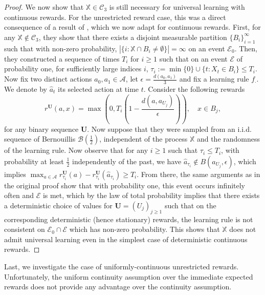 \documentclass[aos]{imsart}
\theoremstyle{plain}
\theoremstyle{remark}
\newcommand{\Acal}{\mathcal{A}}
\newcommand{\Bcal}{\mathcal{B}}
\newcommand{\Ccal}{\mathcal{C}}
\newcommand{\Ecal}{\mathcal{E}}
\newcommand{\Xbb}{\mathbb{X}}
\newcommand{\1}{\mathbbm{1}}%
\newcommand{\mb}[1]{\ensuremath{\boldsymbol{#1}}}
\begin{document}
\begin{proof}
We now show that $\Xbb\in \Ccal_3$ is still necessary for universal learning with continuous rewards. For the unrestricted reward case, this was a direct consequence of a result of \citep*{blanchard:22b}, which we now adapt for continuous rewards. First, for any $\Xbb\notin\Ccal_3$, they show that there exists a disjoint measurable partition $\{B_i\}_{i=1}^\infty$ such that with non-zero probability, $|\{i:\Xbb\cap B_i\neq \emptyset\}|=\infty$ on an event $\Ecal_0$. Then, they constructed a sequence of times $T_i$ for $i\geq 1$ such that on an event $\Ecal$ of probability one, for sufficiently large indices $i$, $\tau_i:=\min\{0\}\cup\{t: X_t\in B_i\} \leq T_i$. Now fix two distinct actions $a_0,a_1\in\Acal$, let $\epsilon = \frac{d(a_0,a_1)}{3}$ and fix a learning rule $f_\cdot$. We denote by $\hat a_t$ its selected action at time $t$. Consider the following rewards
\begin{equation}
    r^{\mb U}(a, x) = \max\left(0,T_i\left(1-\frac{d(a,a_{U_j})}{\epsilon}\right) \right),\quad x\in B_j,
\end{equation}
for any binary sequence $\mb U$. Now suppose that they were sampled from an i.i.d. sequence of Bernouillis $\Bcal(\frac{1}{2})$, independent of the process $\Xbb$ and the randomness of the learning rule. Now observe that for any $i\geq 1$ such that $\tau_i\leq T_i$, with probability at least $\frac{1}{2}$ independently of the past, we have $\hat a_{\tau_i}\notin B(a_{U_j},\epsilon)$, which implies $\max_{a\in\Acal}r^{\mb U}_{\tau_i}(a) - r^{\mb U}_{\tau_i}(\hat a_{\tau_i}) \geq T_i$. From there, the same arguments as in the original proof show that with probability one, this event occurs infinitely often and $\Ecal$ is met, which by the law of total probability implies that there exists a deterministic choice of values for $\mb U=(U_j)_{j\geq 1}$ such that on the corresponding deterministic (hence stationary) rewards, the learning rule is not consistent on $\Ecal_0\cap\Ecal$ which has non-zero probability. This shows that $\Xbb$ does not admit universal learning even in the simplest case of deterministic continuous rewards.
\end{proof}

Last, we investigate the case of uniformly-continuous unrestricted rewards. Unfortunately, the uniform continuity assumption over the immediate expected rewards does not provide any advantage over the continuity assumption.
\end{document}
